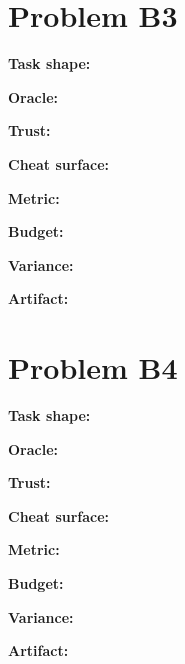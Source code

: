\documentclass[11pt]{article}
\begin{document}
\section*{Problem B3}\label{ans:B3}
\begin{answer}
\textbf{Task shape:} \vspace{1cm}

\textbf{Oracle:} \vspace{1cm}

\textbf{Trust:} \vspace{1cm}

\textbf{Cheat surface:} \vspace{1cm}

\textbf{Metric:} \vspace{1cm}

\textbf{Budget:} \vspace{1cm}

\textbf{Variance:} \vspace{1cm}

\textbf{Artifact:} \vspace{1cm}

\end{answer}
\section*{Problem B4}\label{ans:B4}
\begin{answer}
\textbf{Task shape:} \vspace{1cm}

\textbf{Oracle:} \vspace{1cm}

\textbf{Trust:} \vspace{1cm}

\textbf{Cheat surface:} \vspace{1cm}

\textbf{Metric:} \vspace{1cm}

\textbf{Budget:} \vspace{1cm}

\textbf{Variance:} \vspace{1cm}

\textbf{Artifact:} \vspace{1cm}

\end{answer}
\end{document}
